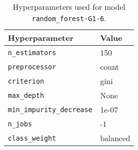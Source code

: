 \begin{table}[H]
\centering
\capstart
\begin{tabularx}{0.48\textwidth}{|X|l|}
\hline
Hyperparameter & Value \\
\hline
\texttt{n\_estimators} & 150 \\
\texttt{preprocessor} & count \\
\texttt{criterion} & gini \\
\texttt{max\_depth} & None \\
\texttt{min\_impurity\_decrease} & 1e-07 \\
\texttt{n\_jobs} & -1 \\
\texttt{class\_weight} & balanced \\
\hline
\end{tabularx}
\caption{Hyperparameters used for model \texttt{random\_forest-G1-6}.}
\label{tab:hyperparameters_best_random_forest}

\end{table}
